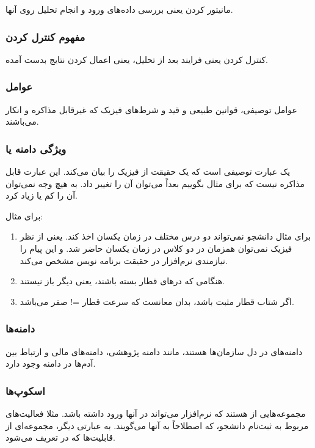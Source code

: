 مانیتور کردن یعنی بررسی داده‌های ورود و انجام تحلیل روی آنها.

\subsubsection{مفهوم کنترل کردن}

کنترل کردن یعنی فرایند بعد از تحلیل، یعنی اعمال کردن نتایج بدست آمده.

\subsubsection{عوامل }

عوامل توصیفی، قوانین طبیعی و قید و شرط‌های فیزیک که غیرقابل مذاکره و انکار
می‌باشند.

\subsubsection{ویژگی دامنه یا }

یک عبارت توصیفی است که یک حقیقت از فیزیک را بیان می‌کند. این عبارت قابل مذاکره
نیست که برای مثال بگوییم بعداً می‌توان آن را تغییر داد. به هیچ وجه نمی‌توان آن
را کم یا زیاد کرد.

برای مثال:

\begin{enumerate}
    \item برای مثال دانشجو نمی‌تواند دو درس مختلف در زمان یکسان اخذ کند. یعنی از
    نظر فیزیک نمی‌توان همزمان در دو کلاس در زمان یکسان حاضر شد. و این پیام را
    نیازمندی نرم‌افزار در حقیقت برنامه نویس مشخص می‌کند.
    \item هنگامی که در‌های قطار بسته باشند، یعنی دیگر باز نیستند.
    \item اگر شتاب قطار مثبت باشد، بدان معانست که سرعت قطار =! صفر می‌باشد.
\end{enumerate}

\subsubsection{دامنه‌ها}

دامنه‌های در دل سازمان‌ها هستند، مانند دامنه پژوهشی، دامنه‌های مالی و ارتباط بین
آدم‌ها در دامنه وجود دارد.

\subsubsection{اسکوپ‌ها}

مجموعه‌هایی از  هستند که نرم‌افزار می‌تواند در آنها ورود
داشته باشد. مثلا فعالیت‌های مربوط به ثبت‌نام دانشجو، که اصطلاحاً به آنها
 می‌گویند. به عبارتی دیگر، مجموعه‌ای از قابلیت‌ها که در
 تعریف می‌شود.

